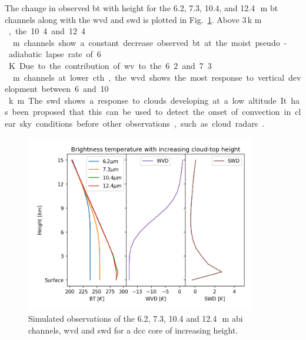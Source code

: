 The change in observed \acrshort{bt} with height for the 6.2, 7.3, 10.4, and 12.4\,\unit{\mu m} \acrshort{bt} channels along with the \acrshort{wvd} and \acrshort{swd} is plotted in Fig.~\ref{fig:cloud_height_channels}. 
Above 3\,\unit{k m }, the 10.4 and 12.4\,\unit{\mu m} channels show a constant decrease observed \acrshort{bt} at the moist pseudo-adiabatic lapse rate of 6\,\unit{K}.
Due to the contribution of \acrshort{wv} to the 6.2 and 7.3\,\unit{\mu m} channels at lower \acrfull{cth}, the \acrshort{wvd} shows the most response to vertical development between 6 and 10\,\unit{k m}.
The \acrshort{swd} shows a response to clouds developing at a low altitude.
It has been proposed that this can be used to detect the onset of convection in clear sky conditions before other observations, such as cloud radars \citep{lindsey_use_2014, lindsey_using_2018}.


\begin{figure}[tp]
    \includegraphics[width=0.9\textwidth]{figures/chapter1_06.png}
    \caption[
    Simulated observations of the 6.2, 7.3, 10.4 and 12.4\,\unit{\mu m} \acrshort{abi} channels, \acrshort{wvd} and \acrshort{swd} for a \acrshort{dcc} core of increasing height
    ]{
    Simulated observations of the 6.2, 7.3, 10.4 and 12.4\,\unit{\mu m} \acrshort{abi} channels, \acrshort{wvd} and \acrshort{swd} for a \acrshort{dcc} core of increasing height.
    }
    \label{fig:cloud_height_channels}
\end{figure}


